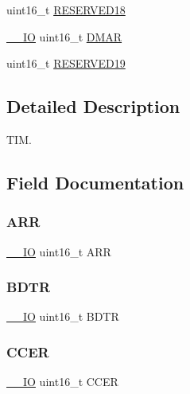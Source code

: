 \begin{DoxyCompactItemize}
\item 
uint16\+\_\+t \mbox{\hyperlink{struct_t_i_m___type_def_a44d7446a23568136b9e32ebdfd756d07}{R\+E\+S\+E\+R\+V\+E\+D18}}
\item 
\mbox{\hyperlink{core__sc300_8h_aec43007d9998a0a0e01faede4133d6be}{\+\_\+\+\_\+\+IO}} uint16\+\_\+t \mbox{\hyperlink{struct_t_i_m___type_def_a30c2d8aa9c76dfba0b9a378b64700bda}{D\+M\+AR}}
\item 
uint16\+\_\+t \mbox{\hyperlink{struct_t_i_m___type_def_a5552e97d80fc1a5bd195a9c81b270ffc}{R\+E\+S\+E\+R\+V\+E\+D19}}
\end{DoxyCompactItemize}


\subsection{Detailed Description}
T\+IM. 

\subsection{Field Documentation}
\mbox{\label{struct_t_i_m___type_def_a0be3cca6fdcbb6e38bfa4c1ce22f5619}} 
\subsubsection{\texorpdfstring{ARR}{ARR}}
{\footnotesize\ttfamily \mbox{\hyperlink{core__sc300_8h_aec43007d9998a0a0e01faede4133d6be}{\+\_\+\+\_\+\+IO}} uint16\+\_\+t A\+RR}

\mbox{\label{struct_t_i_m___type_def_a112c0403ac38905a70cf5aaa9c8cc38a}} 
\subsubsection{\texorpdfstring{BDTR}{BDTR}}
{\footnotesize\ttfamily \mbox{\hyperlink{core__sc300_8h_aec43007d9998a0a0e01faede4133d6be}{\+\_\+\+\_\+\+IO}} uint16\+\_\+t B\+D\+TR}

\mbox{\label{struct_t_i_m___type_def_ab1da3e84848ed66e0577c87c199bfb6d}} 
\subsubsection{\texorpdfstring{CCER}{CCER}}
{\footnotesize\ttfamily \mbox{\hyperlink{core__sc300_8h_aec43007d9998a0a0e01faede4133d6be}{\+\_\+\+\_\+\+IO}} uint16\+\_\+t C\+C\+ER}

